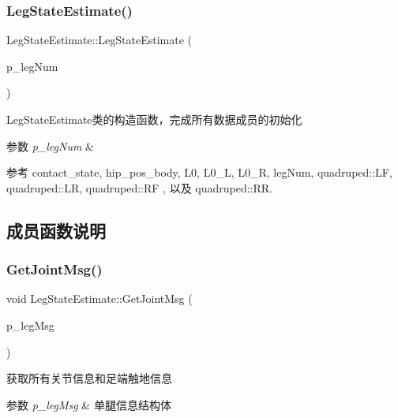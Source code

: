 \subsubsection{\texorpdfstring{Leg\+State\+Estimate()}{LegStateEstimate()}}
{\footnotesize\ttfamily Leg\+State\+Estimate\+::\+Leg\+State\+Estimate (\begin{DoxyParamCaption}\item[{int}]{p\+\_\+leg\+Num }\end{DoxyParamCaption})\hspace{0.3cm}{\ttfamily [explicit]}}



Leg\+State\+Estimate类的构造函数，完成所有数据成员的初始化 


\begin{DoxyParams}{参数}
{\em p\+\_\+leg\+Num} & \\
\hline
\end{DoxyParams}


参考 contact\+\_\+state, hip\+\_\+pos\+\_\+body, L0, L0\+\_\+L, L0\+\_\+R, leg\+Num, quadruped\+::\+LF, quadruped\+::\+LR, quadruped\+::\+RF , 以及 quadruped\+::\+RR.



\subsection{成员函数说明}
\mbox{\label{classquadruped_1_1LegStateEstimate_ab6c64146d3ea706ed1556b1896c6fa05}} 
\subsubsection{\texorpdfstring{Get\+Joint\+Msg()}{GetJointMsg()}}
{\footnotesize\ttfamily void Leg\+State\+Estimate\+::\+Get\+Joint\+Msg (\begin{DoxyParamCaption}\item[{\hyperlink{structlegMsg__t}{leg\+Msg\+\_\+t}}]{p\+\_\+leg\+Msg }\end{DoxyParamCaption})}



获取所有关节信息和足端触地信息 


\begin{DoxyParams}{参数}
{\em p\+\_\+leg\+Msg} & 单腿信息结构体 \\
\hline
\end{DoxyParams}


